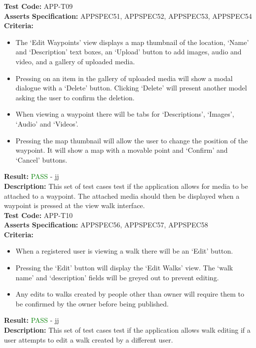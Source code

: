 \documentclass[11pt,a4paper]{report}
\begin{document}
\label{test:APP-T09}
\noindent\textbf{Test Code:} APP-T09\\
\textbf{Asserts Specification:} APPSPEC51, APPSPEC52, APPSPEC53, APPSPEC54\\ 
\textbf{Criteria:} \begin{itemize}
                     \item The `Edit Waypoints' view displays a map thumbnail of the location, `Name' and `Description' text boxes, an `Upload' button to add images, audio and video, and a gallery of uploaded media.
                     \item Pressing on an item in the gallery of uploaded media will show a modal dialogue with a `Delete' button. Clicking `Delete' will present another model asking the user to confirm the deletion.
                     \item When viewing a waypoint there will be tabs for `Descriptions', `Images', `Audio' and `Videos'.
                     \item Pressing the map thumbnail will allow the user to change the position of the waypoint. It will show a map with a movable point and `Confirm' and `Cancel' buttons.
                   \end{itemize}
\textbf{Result:} \textcolor{green}{PASS} - jj\\
\textbf{Description:} This set of test cases test if the application allows for media to be attached to a waypoint. The attached media should then be displayed when a waypoint is pressed at the view walk interface.\\

\label{test:APP-T10}
\noindent\textbf{Test Code:} APP-T10\\
\textbf{Asserts Specification:} APPSPEC56, APPSPEC57, APPSPEC58\\ 
\textbf{Criteria:} \begin{itemize}
                     \item When a registered user is viewing a walk there will be an `Edit' button.
                     \item Pressing the `Edit' button will display the `Edit Walks' view. The `walk name' and `description' fields will be greyed out to prevent editing.
                     \item Any edits to walks created by people other than owner will require them to be confirmed by the owner before being published.
                     
                   \end{itemize}
\textbf{Result:} \textcolor{green}{PASS} - jj\\
\textbf{Description:} This set of test cases test if the application allows walk editing if a user attempts to edit a walk created by a different user.\\
\end{document}
